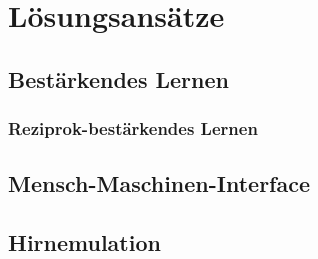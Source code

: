 \chapter{Lösungsansätze}
\section{Bestärkendes Lernen}
\subsection{Reziprok-bestärkendes Lernen}
\section{Mensch-Maschinen-Interface}
\section{Hirnemulation}
